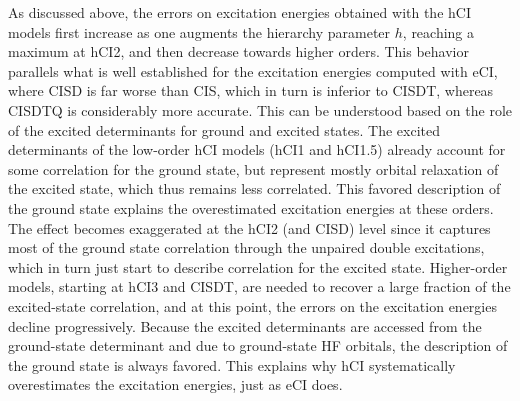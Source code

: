 \documentclass[aip,jcp,reprint,noshowkeys,superscriptaddress]{revtex4-1}
\begin{document}
As discussed above, the errors on excitation energies obtained with the hCI models first increase as one augments the hierarchy parameter $h$, reaching a maximum at hCI2, and then decrease towards higher orders.
This behavior parallels what is well established for the excitation energies computed with eCI, where CISD is far worse than CIS, which in turn is inferior to CISDT, whereas CISDTQ is considerably more accurate.
This can be understood based on the role of the excited determinants for ground and excited states.
The excited determinants of the low-order hCI models (hCI1 and hCI1.5) already account for some correlation for the ground state,
but represent mostly orbital relaxation of the excited state, which thus remains less correlated.
This favored description of the ground state explains the overestimated excitation energies at these orders.
The effect becomes exaggerated at the hCI2 (and CISD) level since it captures most of the ground state correlation through the unpaired double excitations,
which in turn just start to describe correlation for the excited state.
Higher-order models, starting at hCI3 and CISDT, are needed to recover a large fraction of the excited-state correlation, and at this point, the errors on the excitation energies decline progressively.
Because the excited determinants are accessed from the ground-state determinant and due to ground-state HF orbitals, the description of the ground state is always favored.
This explains why hCI systematically overestimates the excitation energies, just as eCI does.
\end{document}
